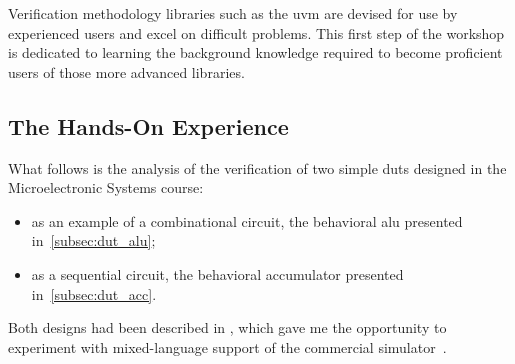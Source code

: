Verification methodology libraries such as the \ac{uvm} are devised for use by experienced users and excel on difficult problems. This first step of the workshop is dedicated to learning the background knowledge required to become proficient users of those more advanced libraries. 

\subsection{The Hands-On Experience}
What follows is the analysis of the verification of two simple \ac{dut}s designed in the Microelectronic Systems course:
\begin{itemize}
    \item as an example of a combinational circuit, the behavioral \ac{alu} presented in~\cref{subsec:dut_alu};
    \item as a sequential circuit, the behavioral accumulator presented in~\cref{subsec:dut_acc}.
\end{itemize}

Both designs had been described in \vhdl, which gave me the opportunity to experiment with mixed-language support of the commercial simulator~\cite{questa}.

\clearpage